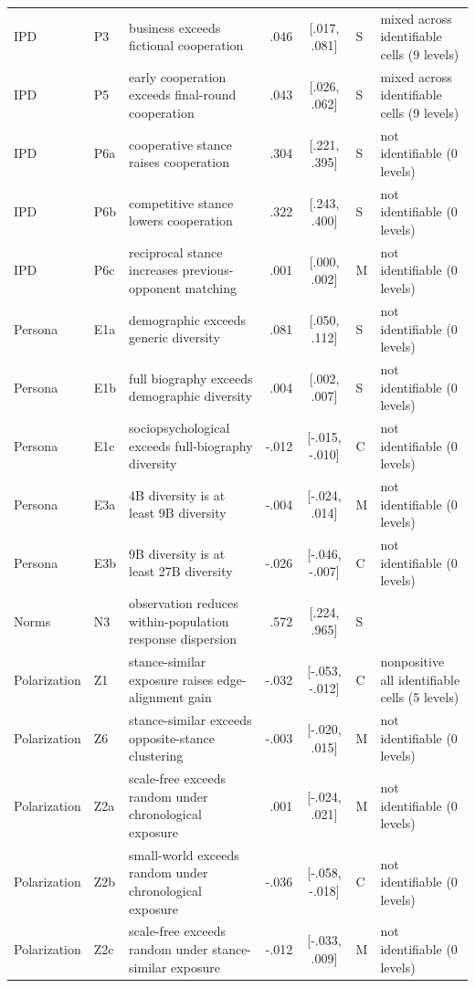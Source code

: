 \documentclass[10pt]{article}
\begin{document}
\begin{landscape}
\begin{longtable}{@{}llp{6.0cm}rclp{5.2cm}@{}}
IPD & P3 & business exceeds fictional cooperation & .046 & [.017, .081] & S & mixed across identifiable cells (9 levels) \\
IPD & P5 & early cooperation exceeds final-round cooperation & .043 & [.026, .062] & S & mixed across identifiable cells (9 levels) \\
IPD & P6a & cooperative stance raises cooperation & .304 & [.221, .395] & S & not identifiable (0 levels) \\
IPD & P6b & competitive stance lowers cooperation & .322 & [.243, .400] & S & not identifiable (0 levels) \\
IPD & P6c & reciprocal stance increases previous-opponent matching & .001 & [.000, .002] & M & not identifiable (0 levels) \\
Persona & E1a & demographic exceeds generic diversity & .081 & [.050, .112] & S & not identifiable (0 levels) \\
Persona & E1b & full biography exceeds demographic diversity & .004 & [.002, .007] & S & not identifiable (0 levels) \\
Persona & E1c & sociopsychological exceeds full-biography diversity & -.012 & [-.015, -.010] & C & not identifiable (0 levels) \\
Persona & E3a & 4B diversity is at least 9B diversity & -.004 & [-.024, .014] & M & not identifiable (0 levels) \\
Persona & E3b & 9B diversity is at least 27B diversity & -.026 & [-.046, -.007] & C & not identifiable (0 levels) \\
Norms & N3 & observation reduces within-population response dispersion & .572 & [.224, .965] & S &  \\
Polarization & Z1 & stance-similar exposure raises edge-alignment gain & -.032 & [-.053, -.012] & C & nonpositive all identifiable cells (5 levels) \\
Polarization & Z6 & stance-similar exceeds opposite-stance clustering & -.003 & [-.020, .015] & M & not identifiable (0 levels) \\
Polarization & Z2a & scale-free exceeds random under chronological exposure & .001 & [-.024, .021] & M & not identifiable (0 levels) \\
Polarization & Z2b & small-world exceeds random under chronological exposure & -.036 & [-.058, -.018] & C & not identifiable (0 levels) \\
Polarization & Z2c & scale-free exceeds random under stance-similar exposure & -.012 & [-.033, .009] & M & not identifiable (0 levels) \\

\end{longtable}
\end{landscape}
\end{document}
